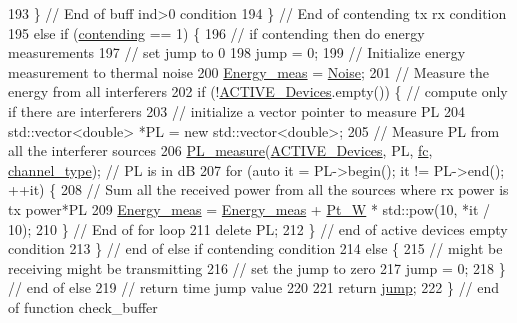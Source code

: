 \begin{DoxyCode}
193         \} \textcolor{comment}{// End of buff ind>0 condition}
194     \} \textcolor{comment}{// End of contending tx rx condition}
195     \textcolor{keywordflow}{else} \textcolor{keywordflow}{if} (\hyperlink{classSTA_ad4226c80ad37062f9648438bce828089}{contending} == 1) \{
196         \textcolor{comment}{// if contending then do energy measurements}
197         \textcolor{comment}{// set jump to 0 }
198         jump = 0;
199         \textcolor{comment}{// Initialize energy measurement to thermal noise}
200         \hyperlink{classSTA_a3d52251caf1e4b973bf795dcf8c2fafa}{Energy\_meas} = \hyperlink{classSTA_ae9a319d9b58f28610defc9e0fc51aa60}{Noise};
201         \textcolor{comment}{// Measure the energy from all interferers}
202         \textcolor{keywordflow}{if} (!\hyperlink{classSTA_a536179d10f961ae6f7330b980a13668e}{ACTIVE\_Devices}.empty()) \{ \textcolor{comment}{// compute only if there are interferers}
203             \textcolor{comment}{// initialize a vector pointer to measure PL}
204             std::vector<double> *PL = \textcolor{keyword}{new} std::vector<double>;
205             \textcolor{comment}{// Measure PL from all the interferer sources}
206             \hyperlink{PL__measure_8cpp_afb433c5f099becf495d3c9d29ffc707d}{PL\_measure}(\hyperlink{classSTA_a536179d10f961ae6f7330b980a13668e}{ACTIVE\_Devices}, PL, \hyperlink{classSTA_a07c54eac4b0f34790e0a2e4dcbe720ac}{fc}, 
      \hyperlink{classSTA_a5d1a873bdd6733103441abadf4db1475}{channel\_type}); \textcolor{comment}{// PL is in dB}
207             \textcolor{keywordflow}{for} (\textcolor{keyword}{auto} it = PL->begin(); it != PL->end(); ++it) \{
208                 \textcolor{comment}{// Sum all the received power from all the sources where rx power is tx power*PL}
209                 \hyperlink{classSTA_a3d52251caf1e4b973bf795dcf8c2fafa}{Energy\_meas} = \hyperlink{classSTA_a3d52251caf1e4b973bf795dcf8c2fafa}{Energy\_meas} + \hyperlink{classSTA_a8ec6260021c741ccc08a6ec25793c1f3}{Pt\_W} * std::pow(10, *it / 10);
210             \} \textcolor{comment}{// End of for loop}
211             \textcolor{keyword}{delete} PL;
212         \} \textcolor{comment}{// end of active devices empty condition}
213     \} \textcolor{comment}{// end of else if contending condition}
214     \textcolor{keywordflow}{else} \{
215         \textcolor{comment}{// might be receiving might be transmitting}
216         \textcolor{comment}{// set the jump to zero}
217         jump = 0;
218     \} \textcolor{comment}{// end of else}
219       \textcolor{comment}{// return time jump value}
220         
221     \textcolor{keywordflow}{return} \hyperlink{scenenario__nAP__nSTA__ncell__multi__thread_8cpp_a17538519ca141179ae5cee37717e7843}{jump};
222 \} \textcolor{comment}{// end of function check\_buffer}
\end{DoxyCode}
